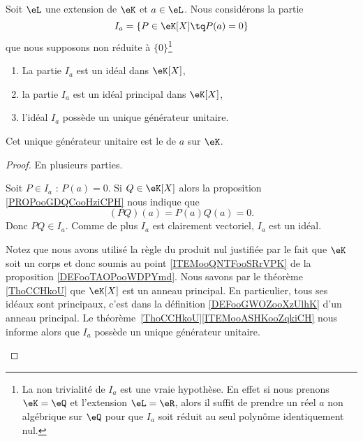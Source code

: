 \begin{lemmaDef}    \label{DefCVMooFGSAgL}
	Soit \( \eL\) une extension de \( \eK\) et \( a\in \eL\). Nous considérons la partie
	\begin{equation}
		I_a=\{ P\in \eK[X]\tq P(a)=0 \}
	\end{equation}
	que nous supposons non réduite à \( \{ 0 \}\)\footnote{La non trivialité de \( I_a\) est une vraie hypothèse. En effet si nous prenons \( \eK=\eQ\) et l'extension \( \eL=\eR\), alors il suffit de prendre un réel \( a\) non algébrique sur \( \eQ\) pour que \( I_a\) soit réduit au seul polynôme identiquement nul.}

	\begin{enumerate}
		\item       \label{ITEMooUNLCooIfYZry}
		      La partie \( I_a\) est un idéal dans \( \eK[X]\),
		\item       \label{ITEMooDCDRooPDnnbu}
		      la partie \( I_a\) est un idéal principal dans \( \eK[X]\),
		\item       \label{ITEMooXFYQooTuMzIu}
		      l'idéal \( I_a\) possède un unique générateur unitaire.
	\end{enumerate}

	Cet unique générateur unitaire est le  de \( a\) sur \( \eK\).
\end{lemmaDef}

\begin{proof}
	En plusieurs parties.
	\begin{subproof}
		Soit \( P\in I_a\) : \( P(a)=0\). Si \( Q\in \eK[X]\) alors la proposition \ref{PROPooGDQCooHziCPH} nous indique que
		\begin{equation}
			(PQ)(a)=P(a)Q(a)=0.
		\end{equation}
		Donc \( PQ\in I_a\). Comme de plus \( I_a\) est clairement vectoriel, \( I_a\) est un idéal.

		Notez que nous avons utilisé la règle du produit nul justifiée par le fait que \( \eK\) soit un corps et donc soumis au point \ref{ITEMooQNTFooSRrVPK} de la proposition \ref{DEFooTAOPooWDPYmd}.
		Nous savons par le théorème \ref{ThoCCHkoU} que \( \eK[X]\) est un anneau principal. En particulier, tous ses idéaux sont principaux, c'est dans la définition \ref{DEFooGWOZooXzUlhK} d'un anneau principal.
		Le théorème~\ref{ThoCCHkoU}\ref{ITEMooASHKooZqkiCH} nous informe alors que \( I_a\) possède un unique générateur unitaire.
	\end{subproof}
\end{proof}

